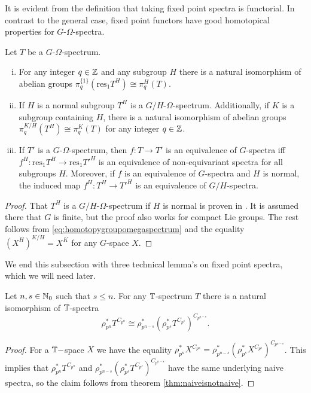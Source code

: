 It is evident from the definition that taking fixed point spectra is functorial.
In contrast to the general case, fixed point functors have good homotopical
properties for $G$-$\Omega$-spectra.
\begin{lem}\label{lem:omegaspectrafixedpoints}
Let $T$ be a $G$-$\Omega$-spectrum.
\begin{enumerate}[(i)]
\item For any integer $q\in \mathbb{Z}$ and any subgroup $H$ there is a natural isomorphism 
of abelian groups $\pi_q^{\{1\}}(\mathrm{res}_1 T^H)\cong \pi_q^H(T)$.
\item  If $H$ is a normal subgroup $T^H$ is a $G/H$-$\Omega$-spectrum. Additionally,
if $K$ is a subgroup containing $H$, there is a natural isomorphism of abelian groups
$\pi_q^{K/H}(T^H)\cong \pi_q^K(T)$ for any integer $q\in \mathbb{Z}$.
\item If $T'$ is a $G$-$\Omega$-spectrum, then $f:T\to T'$ is an equivalence of $G$-spectra
iff $f^H: \mathrm{res}_1 T^H\to \mathrm{res}_1 T'^H$ is an equivalence of non-equivariant spectra
for all subgroups $H$. Moreover, if $f$ is an equivalence of $G$-spectra and $H$ is normal, the induced
map $f^H:T^H\to T'^H$ is an equivalence of $G/H$-spectra.
\end{enumerate}
\end{lem}

\begin{proof}
That $T^H$ is a $G/H$-$\Omega$-spectrum if $H$ is normal 
is proven in \cite[Lemma~6.20, \pno~24]{rvadams}. It is assumed there that $G$
is finite, but the proof also works for compact Lie groups. The rest follows
from \eqref{eq:homotopygroupomegaspectrum} and the equality 
$
(X^H)^{K/H}= X^K
$
for any $G$-space $X$. 
\end{proof}

We end this subsection with three technical lemma's on fixed point spectra, which we will need later.

\begin{lem}\label{lem:separatefixed}
Let $n, s \in \mathbb{N}_0$ such that $ s\le n$.
 For any $\mathbb{T}$-spectrum $T$ there is a natural isomorphism of $\mathbb{T}$-spectra
\[
\rho_{ p^n }^\ast T^{ C_{ p^n } } \cong \rho_{ p^{ n - s } }^\ast
\left(\rho_{ p^s }^\ast T^{ C_{ p^s } }\right)^{ C_{ p^{ n - s } } }.
\]
\end{lem}

\begin{proof}
For a $\mathbb{T}-$space $X$ we have the equality
$\rho_{ p^n }^\ast X^{ C_{ p^n } } = \rho_{ p^{ n - s } }^\ast
\left(\rho_{ p^s }^\ast X^{ C_{ p^s } }\right)^{ C_{ p^{ n - s } } }$.
This implies that $\rho_{ p^n }^\ast T^{ C_{ p^n } } $
and $\rho_{ p^{ n - s } }^\ast
\left(\rho_{ p^s }^\ast T^{ C_{ p^s } }\right)^{ C_{ p^{ n - s } } }$
have the same underlying naive spectra, so the claim
follows from theorem \ref{thm:naiveisnotnaive}.
\end{proof}

